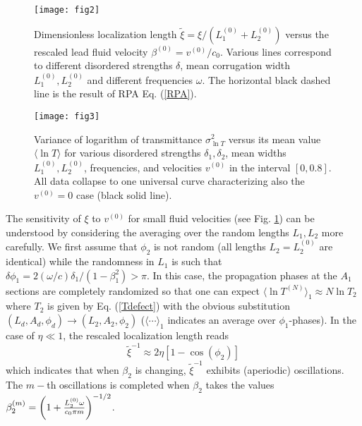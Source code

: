 \documentclass[aps,prl,twocolumn,groupedaddress,amsmath,amssymb]{revtex4}
\begin{document}
\begin{figure}[h]
\texttt{[image: fig2]}
\caption{Dimensionless localization length ${\tilde \xi}=\xi/(L_1^{(0)}+L_2^{(0)})$ versus the rescaled lead fluid velocity  
$\beta^{(0)}=v^{(0)}/c_0$. Various lines correspond to different disordered strengths $\delta$, mean corrugation width $L_1^{(0)}, 
L_2^{(0)}$ and different frequencies $\omega$. The horizontal black dashed line is the result of RPA Eq. (\ref{RPA}).
}
\label{fig2}
\end{figure}





\begin{figure}[h]
\texttt{[image: fig3]}
\caption{Variance of logarithm of transmittance $\sigma_{\ln T}^2$ versus its mean value $\langle \ln T\rangle$ for various 
disordered strengths $\delta_1,\delta_2$, mean widths $L_1^{(0)}, L_2^{(0)}$, frequencies, and velocities $v^{(0)}$ in the interval 
$[0,0.8]$. All data collapse to one universal curve characterizing also the $v^{(0)}=0$ case (black solid line).
}
\label{fig3}
\end{figure}


The sensitivity of $\xi$ to $v^{(0)}$ for small fluid velocities (see Fig. \ref{fig2}) can be understood by considering the averaging over 
the random lengths $L_1,L_2$ more carefully. We first assume that $\phi_2$ is not random (all lengths $L_2=L_2^{(0)}$ are identical) 
while the randomness in $L_1$ is such that $\delta \phi_1=2(\omega/c) \delta_1/(1-\beta_1^2)>\pi$. In this case, the propagation 
phases at the $A_1$ sections are completely randomized so that one can expect $\langle \ln T^{(N)}\rangle_1 \approx N \ln T_2$ where 
$T_2$ is given by Eq. (\ref{Tdefect}) with the obvious substitution $(L_d,A_d,\phi_d)\rightarrow (L_2, A_2,\phi_2)$ ($\langle\cdots 
\rangle_1$ indicates an average over $\phi_1$-phases). In the case of $\eta\ll 1$, the rescaled localization length reads
\begin{equation}
\label{rloc}
{\tilde \xi}^{-1} \approx 2\eta \left[1-\cos(\phi_2)\right]
\end{equation}
which indicates that when $\beta_2$ is changing, ${\tilde \xi}^{-1}$ exhibits (aperiodic) oscillations. The $m-$th oscillations is 
completed when $\beta_2$ takes the values $\beta_{2}^{(m)}=\left(1+{L_2^{(0)}\omega\over c_0\pi m}\right)^{-1/2}$.
\end{document}
